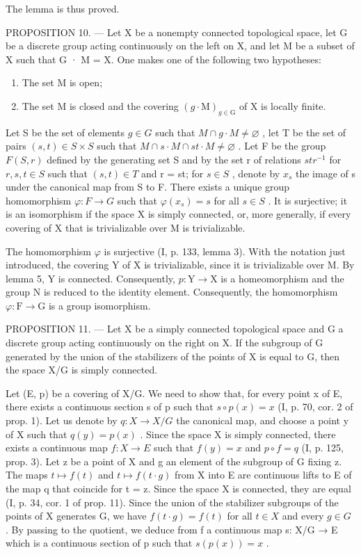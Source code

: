 The lemma is thus proved.

PROPOSITION 10. --- Let X be a nonempty connected topological space, let G be a discrete group acting continuously on the left on X, and let M be a subset of X such that G · M = X. One makes one of the following two hypotheses:

\begin{enumerate}
\def\labelenumi{(\roman{enumi})}
\item
  The set M is open;
\item
  The set M is closed and the covering \((g \cdot \mathrm{M})_{g \in \mathrm{G}}\) of X is locally finite.
\end{enumerate}

Let S be the set of elements \(g \in G\) such that \(M \cap g \cdot M \neq \varnothing\) , let T be the set of pairs \((s, t) \in S \times S\) such that \(M \cap s \cdot M \cap st \cdot M \neq \varnothing\) . Let F be the group \(F(S, r)\) defined by the generating set S and by the set r of relations \(str^{-1}\) for \(r, s, t \in S\) such that \((s, t) \in T\) and r = st; for \(s \in S\) , denote by \(x_s\) the image of s under the canonical map from S to F. There exists a unique group homomorphism \(\varphi: F \to G\) such that \(\varphi(x_s) = s\) for all \(s \in S\) . It is surjective; it is an isomorphism if the space X is simply connected, or, more generally, if every covering of X that is trivializable over M is trivializable.

The homomorphism \(\varphi\) is surjective (I, p. 133, lemma 3). With the notation just introduced, the covering Y of X is trivializable, since it is trivializable over M. By lemma 5, Y is connected. Consequently, \(p\colon\mathrm{Y}\to\mathrm{X}\) is a homeomorphism and the group N is reduced to the identity element. Consequently, the homomorphism \(\varphi\colon\mathrm{F}\to\mathrm{G}\) is a group isomorphism.

PROPOSITION 11. --- Let X be a simply connected topological space and G a discrete group acting continuously on the right on X. If the subgroup of G generated by the union of the stabilizers of the points of X is equal to G, then the space X/G is simply connected.

Let (E, p) be a covering of X/G. We need to show that, for every point x of E, there exists a continuous section s of p such that \(s \circ p(x) = x\) (I, p. 70, cor. 2 of prop. 1). Let us denote by \(q: X \to X/G\) the canonical map, and choose a point y of X such that \(q(y) = p(x)\) . Since the space X is simply connected, there exists a continuous map \(f: X \to E\) such that \(f(y) = x\) and \(p \circ f = q\) (I, p. 125, prop. 3). Let z be a point of X and g an element of the subgroup of G fixing z. The maps \(t \mapsto f(t)\) and \(t \mapsto f(t \cdot g)\) from X into E are continuous lifts to E of the map q that coincide for t = z. Since the space X is connected, they are equal (I, p. 34, cor. 1 of prop. 11). Since the union of the stabilizer subgroups of the points of X generates G, we have \(f(t \cdot g) = f(t)\) for all \(t \in X\) and every \(g \in G\) . By passing to the quotient, we deduce from f a continuous map s: X/G → E which is a continuous section of p such that \(s(p(x)) = x\) .

